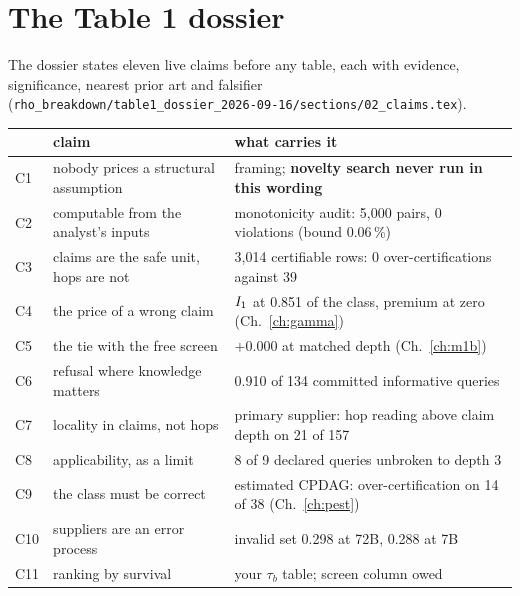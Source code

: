 \begin{antes}
\end{antes}

\section{The Table 1 dossier}

The dossier states eleven live claims before any table, each with evidence, significance, nearest
prior art and falsifier (\nolinkurl{rho_breakdown/table1_dossier_2026-09-16/sections/02_claims.tex}).

\begin{center}\footnotesize
\begin{tabular}{@{}lll@{}}
\toprule
& claim & what carries it \\
\midrule
C1 & nobody prices a structural assumption & framing; \textbf{novelty search never run in this wording} \\
C2 & computable from the analyst's inputs & monotonicity audit: 5,000 pairs, 0 violations (bound 0.06\,\%) \\
C3 & claims are the safe unit, hops are not & 3,014 certifiable rows: 0 over-certifications against 39 \\
C4 & the price of a wrong claim & $I_{1}$ at 0.851 of the class, premium at zero (Ch.~\ref{ch:gamma}) \\
C5 & the tie with the free screen & $+0.000$ at matched depth (Ch.~\ref{ch:m1b}) \\
C6 & refusal where knowledge matters & 0.910 of 134 committed informative queries \\
C7 & locality in claims, not hops & primary supplier: hop reading above claim depth on 21 of 157 \\
C8 & applicability, as a limit & 8 of 9 declared queries unbroken to depth 3 \\
C9 & the class must be correct & estimated CPDAG: over-certification on 14 of 38 (Ch.~\ref{ch:pest}) \\
C10 & suppliers are an error process & invalid set 0.298 at 72B, 0.288 at 7B \\
C11 & ranking by survival & your $\tau_b$ table; screen column owed \\
\bottomrule
\end{tabular}
\end{center}

